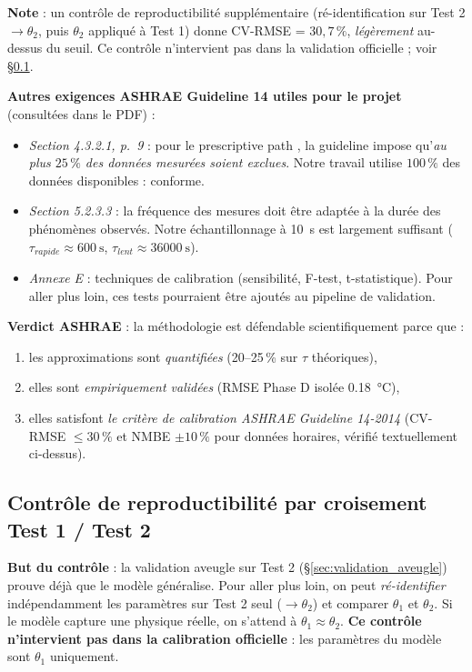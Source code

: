 \documentclass[11pt,a4paper]{article}
\begin{document}
\textbf{Note} : un contrôle de reproductibilité supplémentaire (ré-identification sur
Test 2 $\to \theta_2$, puis $\theta_2$ appliqué à Test 1) donne CV-RMSE = $30{,}7\,\%$,
\emph{légèrement} au-dessus du seuil. Ce contrôle n'intervient pas dans la validation
officielle ; voir \S\ref{sec:crosstest}.

\textbf{Autres exigences ASHRAE Guideline 14 utiles pour le projet}
(consultées dans le PDF) :
\begin{itemize}[itemsep=2pt]
\item \emph{Section 4.3.2.1, p.~9} : pour le \og prescriptive path \fg, la guideline impose
qu'\emph{au plus $25\,\%$ des données mesurées soient exclues}. Notre travail utilise
$100\,\%$ des données disponibles : conforme.
\item \emph{Section 5.2.3.3} : la fréquence des mesures doit être adaptée à la durée des
phénomènes observés. Notre échantillonnage à \SI{10}{\second} est largement suffisant
($\tau_{rapide} \approx \SI{600}{\second}$, $\tau_{lent} \approx \SI{36000}{\second}$).
\item \emph{Annexe E} : techniques de calibration (sensibilité, F-test, t-statistique).
Pour aller plus loin, ces tests pourraient être ajoutés au pipeline de validation.
\end{itemize}

\textbf{Verdict ASHRAE} : la méthodologie est défendable scientifiquement parce que :
\begin{enumerate}[itemsep=0pt]
\item les approximations sont \emph{quantifiées} (20--25\,\% sur $\tau$ théoriques),
\item elles sont \emph{empiriquement validées} (RMSE Phase D isolée \SI{0,18}{\celsius}),
\item elles satisfont \emph{le critère de calibration ASHRAE Guideline 14-2014}
(CV-RMSE $\le 30\,\%$ et NMBE $\pm 10\,\%$ pour données horaires, vérifié textuellement
ci-dessus).
\end{enumerate}

\subsection{Contrôle de reproductibilité par croisement Test 1 / Test 2}\label{sec:crosstest}

\textbf{But du contrôle} : la validation aveugle sur Test 2 (\S\ref{sec:validation_aveugle})
prouve déjà que le modèle généralise. Pour aller plus loin, on peut \emph{ré-identifier}
indépendamment les paramètres sur Test 2 seul ($\to \theta_2$) et comparer $\theta_1$ et
$\theta_2$. Si le modèle capture une physique réelle, on s'attend à $\theta_1 \approx \theta_2$.
\textbf{Ce contrôle n'intervient pas dans la calibration officielle} : les paramètres du
modèle sont $\theta_1$ uniquement.
\end{document}
